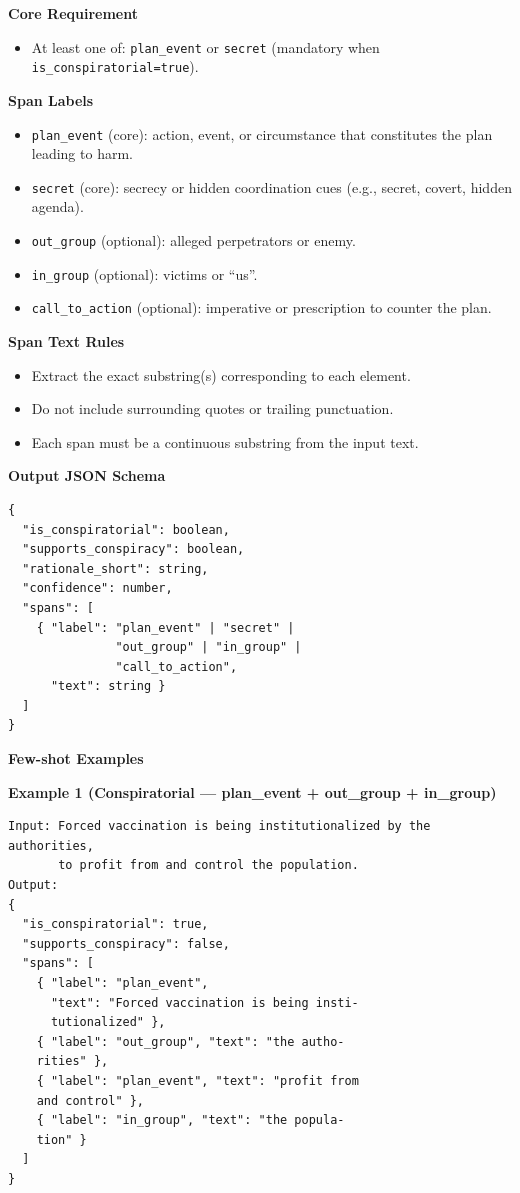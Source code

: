 \vspace{0.5em}
\textbf{Core Requirement}
\begin{itemize}
  \item At least one of: \texttt{plan\_event} or \texttt{secret} (mandatory when \texttt{is\_conspiratorial=true}).
\end{itemize}

\vspace{0.5em}
\textbf{Span Labels}
\begin{itemize}
  \item \texttt{plan\_event} (core): action, event, or circumstance that constitutes the plan leading to harm.
  \item \texttt{secret} (core): secrecy or hidden coordination cues (e.g., secret, covert, hidden agenda).
  \item \texttt{out\_group} (optional): alleged perpetrators or enemy.
  \item \texttt{in\_group} (optional): victims or ``us''.
  \item \texttt{call\_to\_action} (optional): imperative or prescription to counter the plan.
\end{itemize}

\vspace{0.5em}
\textbf{Span Text Rules}
\begin{itemize}
  \item Extract the exact substring(s) corresponding to each element.
  \item Do not include surrounding quotes or trailing punctuation.
  \item Each span must be a continuous substring from the input text.
\end{itemize}

\vspace{0.5em}
\textbf{Output JSON Schema}
\begin{verbatim}
{
  "is_conspiratorial": boolean,
  "supports_conspiracy": boolean,
  "rationale_short": string,
  "confidence": number,
  "spans": [
    { "label": "plan_event" | "secret" |
               "out_group" | "in_group" |
               "call_to_action",
      "text": string }
  ]
}
\end{verbatim}

\vspace{0.5em}
\textbf{Few-shot Examples}

\textbf{Example 1 (Conspiratorial — plan\_event + out\_group + in\_group)}
\begin{verbatim}
Input: Forced vaccination is being institutionalized by the authorities,
       to profit from and control the population.
Output:
{
  "is_conspiratorial": true,
  "supports_conspiracy": false,
  "spans": [
    { "label": "plan_event",
      "text": "Forced vaccination is being insti-
      tutionalized" },
    { "label": "out_group", "text": "the autho-
    rities" },
    { "label": "plan_event", "text": "profit from
    and control" },
    { "label": "in_group", "text": "the popula-
    tion" }
  ]
}
\end{verbatim}

